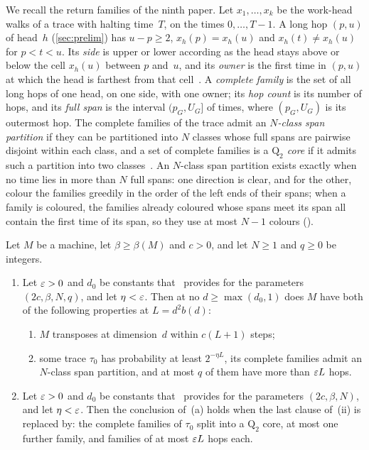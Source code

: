 We recall the return families of the ninth paper. Let $x_1,\dots,x_k$ be the work-head walks of a trace with halting
time~$T$, on the times $0,\dots,T-1$. A long hop $(p,u)$ of head~$h$ (\cref{sec:prelim}) has $u-p\ge2$, $x_h(p)=x_h(u)$
and $x_h(t)\ne x_h(u)$ for $p<t<u$. Its \emph{side} is upper or lower according as the head stays above or below the
cell $x_h(u)$ between $p$ and~$u$, and its \emph{owner} is the first time in $(p,u)$ at which the head is farthest from
that cell~\cite[Section~2.2]{BoundedNesting2026}. A \emph{complete family} is the set of all long hops of one head, on one
side, with one owner; its \emph{hop count} is its number of hops, and its \emph{full span} is the interval $(p_G,U_G]$ of
times, where $(p_G,U_G)$ is its outermost hop. The complete families of the trace admit an \emph{$N$-class span
partition} if they can be partitioned into $N$ classes whose full spans are pairwise disjoint within each class, and a
set of complete families is a \emph{$\mathrm Q_2$ core} if it admits such a partition into two
classes~\cite[Definition~2.1]{SourceCovers2026}. An $N$-class span partition exists exactly when no time lies in more
than $N$ full spans: one direction is clear, and for the other, colour the families greedily in the order of the left
ends of their spans; when a family is coloured, the families already coloured whose spans meet its span all contain the
first time of its span, so they use at most $N-1$ colours ().

\begin{theorem}\label{thm:LA}
Let $M$ be a machine, let $\beta\ge\beta(M)$ and $c>0$, and let $N\ge1$ and $q\ge0$ be integers.
\begin{enumerate}[label=(\alph*)]
\item Let $\varepsilon>0$ and $d_0$ be constants that~\cite[Corollary~4.5]{SourceCovers2026} provides for the parameters
$(2c,\beta,N,q)$, and let $\eta<\varepsilon$. Then at no $d\ge\max(d_0,1)$ does $M$ have both of the following properties at
$L=d^2b(d)$:
\begin{enumerate}[label=(\roman*)]
\item $M$ transposes at dimension~$d$ within $c(L+1)$ steps;
\item some trace $\tau_0$ has probability at least $2^{-\eta L}$, its complete families admit an $N$-class span partition,
and at most $q$ of them have more than $\varepsilon L$ hops.
\end{enumerate}
\item Let $\varepsilon>0$ and $d_0$ be constants that~\cite[Corollary~4.3]{SourceCovers2026} provides for the parameters
$(2c,\beta,N)$, and let $\eta<\varepsilon$. Then the conclusion of~(a) holds when the last clause of~(ii) is replaced by:
the complete families of $\tau_0$ split into a $\mathrm Q_2$ core, at most one further family, and families of at most
$\varepsilon L$ hops each.
\end{enumerate}
\end{theorem}

